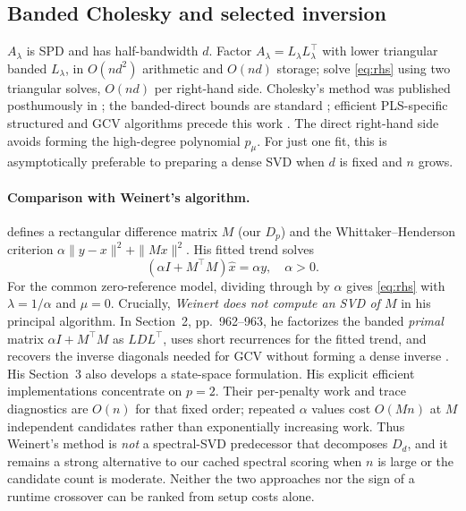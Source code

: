 \subsection{Banded Cholesky and selected inversion}
$A_\lambda$ is SPD and has half-bandwidth $d$. Factor $A_\lambda=L_\lambda L_\lambda^\top$ with lower triangular banded $L_\lambda$, in $O(nd^2)$ arithmetic and $O(nd)$ storage; solve \eqref{eq:rhs} using two triangular solves, $O(nd)$ per right-hand side. Cholesky's method was published posthumously in \citet{benoit1924}; the banded-direct bounds are standard \citep{golubvanloan2013,anderson1999}; efficient PLS-specific structured and GCV algorithms precede this work \citep{weinert2007}. The direct right-hand side avoids forming the high-degree polynomial $p_\mu$. For just one fit, this is asymptotically preferable to preparing a dense SVD when $d$ is fixed and $n$ grows.

\paragraph{Comparison with Weinert's algorithm.}
\citet[Sec.~1, pp.~959--961]{weinert2007} defines a
rectangular difference matrix $M$ (our $D_p$) and the
Whittaker--Henderson criterion
$\alpha\|y-x\|^2+\|Mx\|^2$.
His fitted trend solves
\begin{equation}\label{eq:weinert-primal}
(\alpha I+M^\top M)\widehat x=\alpha y,
\quad \alpha>0.
\end{equation}
For the common zero-reference model, dividing through by
$\alpha$ gives \eqref{eq:rhs} with
$\lambda=1/\alpha$ and $\mu=0$.
Crucially, \emph{Weinert does not compute an SVD of $M$}
in his principal algorithm. In Section~2,
pp.~962--963, he factorizes the banded \emph{primal}
matrix $\alpha I+M^\top M$ as $LDL^\top$,
uses short recurrences for the fitted trend,
and recovers the inverse diagonals needed for
GCV without forming a dense inverse
\citep[Eqs.~(2.1)--(2.14)]{weinert2007}.
His Section~3 also develops a state-space formulation.
His explicit efficient implementations concentrate on
$p=2$. Their per-penalty work and trace diagnostics
are $O(n)$ for that fixed order; repeated
$\alpha$ values cost $O(Mn)$ at $M$ independent
candidates rather than exponentially increasing work.
Thus Weinert's method is \emph{not} a spectral-SVD
predecessor that decomposes $D_d$, and it remains
a strong alternative to our cached spectral scoring
when $n$ is large or the candidate count is moderate.
Neither the two approaches nor the sign of a runtime
crossover can be ranked from setup costs alone.

